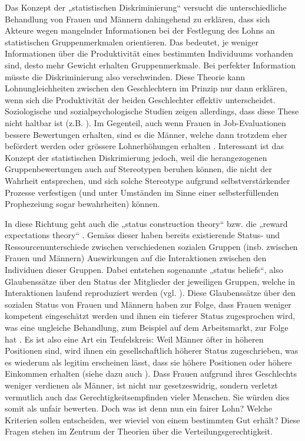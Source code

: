 \documentclass[a4paper,12pt]{article}
\begin{document}
Das Konzept der „statistischen Diskriminierung“ \citep{Arrow-1972,Phelps-1972} versucht
die unterschiedliche Behandlung von Frauen und Männern dahingehend zu erklären,
dass sich Akteure wegen mangelnder Informationen bei der Festlegung des Lohns
an statistischen Gruppenmerkmalen orientieren. Das bedeutet, je weniger Informationen über die Produktivität eines bestimmten Individuums vorhanden sind, desto mehr Gewicht erhalten Gruppenmerkmale. Bei perfekter Information müsste die Diskriminierung also verschwinden. Diese Theorie kann
Lohnungleichheiten zwischen den Geschlechtern im Prinzip nur dann erklären, wenn
sich die Produktivität der beiden Geschlechter effektiv unterscheidet. Soziologische und
sozialpsychologische Studien zeigen allerdings, dass diese These nicht haltbar
ist (z.B. \citealp{Bielby-Bielby-1988}). Im Gegenteil, auch wenn Frauen in
Job-Evaluationen bessere Bewertungen erhalten, sind es die Männer, welche dann
trotzdem eher befördert werden \citep{Blau-DeVaro-2007} oder grössere
Lohnerhöhungen erhalten \citep{Castilla-2012}. Interessant ist das Konzept der 
statistischen Diskrimierung jedoch, weil die herangezogenen Gruppenbewertungen auch auf 
Stereotypen beruhen können, die nicht der Wahrheit 
entsprechen, und sich solche Stereotype aufgrund selbstverstärkender Prozesse 
verfestigen (und unter Umständen im Sinne einer selbsterfüllenden Prophezeiung 
sogar bewahrheiten) können.

In diese Richtung geht auch die „status construction theory“ \citep{Ridgeway-1997,Ridgeway-2001} bzw. die „reward expectations theory“ \citep{Auspurg-etal-2017}. Gemäss dieser haben bereits existierende Status- und Ressourcenunterschiede zwischen verschiedenen sozialen Gruppen (insb. zwischen
Frauen und Männern) Auswirkungen auf die Interaktionen zwischen den Individuen
dieser Gruppen. Dabei entstehen sogenannte „status beliefs“, also Glaubenssätze
über den Status der Mitglieder der jeweiligen Gruppen, welche in Interaktionen
laufend reproduziert werden (vgl. \citealp{Goffman-1977}). Diese Glaubenssätze
über den sozialen Status von Frauen und Männern haben zur Folge, dass Frauen
weniger kompetent eingeschätzt werden und ihnen ein tieferer Status
zugesprochen wird, was eine ungleiche Behandlung, zum Beispiel auf dem Arbeitsmarkt,
zur Folge hat \citep{Ridgeway-1997}. Es ist also eine Art ein Teufelskreis:
Weil Männer öfter in höheren Positionen sind, wird ihnen ein gesellschaftlich
höherer Status zugeschrieben, was es wiederum als legitim erscheinen lässt,
dass sie höhere Positionen oder höhere Einkommen erhalten (siehe dazu auch
\citealp{Berger-etal-1972}).
Dass Frauen aufgrund ihres Geschlechts weniger verdienen als Männer, ist nicht nur gesetzeswidrig, sondern verletzt vermutlich auch das Gerechtigkeitsempfinden vieler Menschen. Sie würden dies somit als unfair bewerten. Doch was ist denn nun ein fairer Lohn? Welche Kriterien sollen entscheiden, wer wieviel von einem bestimmten Gut erhält? Diese Fragen stehen im Zentrum der Theorien über die Verteilungsgerechtigkeit.
\end{document}
